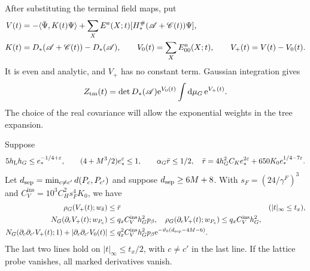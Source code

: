 After substituting the terminal field maps, put
\begin{align}
 V(t)&=-\langle\bar\Psi,K(t)\Psi\rangle
           +\sum_X E^a(X;t)[H_*^\#(\mathscr A+\mathscr C(t))\Psi],
                                                        \notag\\
 K(t)&=D_*(\mathscr A+\mathscr C(t))-D_*(\mathscr A),\qquad
 V_0(t)=\sum_XE^a_{00}(X;t),\qquad V_+(t)=V(t)-V_0(t).
                                    \label{eq:interacting-tree-interaction}
\end{align}
It is even and analytic, and $V_+$ has no
constant term. Gaussian integration gives
\begin{equation}\label{eq:interacting-real-Gaussian-factor}
 Z_{\rm tm}(t)=\det D_*(\mathscr A)\mathrm e^{V_0(t)}
                                  \int\mathrm d\mu_G\,\mathrm e^{V_+(t)} .
\end{equation}
The choice of the real covariance will allow
the exponential weights in the tree expansion.

\begin{proposition}\label{prop:interacting-differentiated-norms}
Suppose
\begin{equation}\label{eq:interacting-tree-smallness}
 5h_{\rm L}h_G\le e_*^{-1/4+\varepsilon},\qquad
 (4+M^3/2)e_*^\varepsilon\le1,\qquad
 \alpha_G\bar r\le1/2,
 \quad
 \bar r=4h_G^2C_Ke_*^{2\varepsilon}
                            +650K_0e_*^{1/4-7\varepsilon}.
\end{equation}
Let $d_{\rm sep}=\min_{c\ne c'}d(P_c,P_{c'})$ and
suppose $d_{\rm sep}\ge6M+8$.
With
$s_F=(24/\gamma^F)^3$ and
$C_V^{\mathrm{ins}}=10^3C_H^2s_F^4K_0$, we have
\begin{align}
 \rho_G(V_+(t);w_\delta)&\le\bar r
                                      &&(|t|_\infty\le t_x),\notag\\
 N_G(\partial_cV_+(t);w_{P_c})&\le q_xC_V^{\mathrm{ins}}h_G^2p_\beta,
 \quad
 \rho_G(\partial_cV_+(t);w_{P_c})\le q_xC_V^{\mathrm{ins}}h_G^2,\notag\\
 N_G(\partial_c\partial_{c'}V_+(t);1)
          +|\partial_c\partial_{c'}V_0(t)|
 &\le q_x^2C_V^{\mathrm{ins}}h_G^2p_\beta
                    \mathrm e^{-\vartheta_0(d_{\rm sep}-4M-6)} .
                             \label{eq:interacting-differentiated-norms}
\end{align}
The last two lines hold on $|t|_\infty\le t_x/2$,
with $c\ne c'$ in the last line. If the lattice
probe vanishes, all marked derivatives vanish.
\end{proposition}

